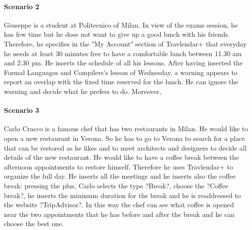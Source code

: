 \documentclass[12pt,titlepage]{article}
\begin{document}
\paragraph{Scenario 2}
Giuseppe is a student at Politecnico of Milan. In view of the exams session, he has few time but he does not want to give up a good lunch with his friends. Therefore, he specifies in the "My Account" section of Travlendar+ that everyday he needs at least 30 minutes free to have a comfortable lunch between 11.30 am and 2.30 pm. He inserts the schedule of all his lessons. After having inserted the Formal Languages and Compilers's lesson of Wednesday, a warning appears to report an overlap with the fixed time reserved for the lunch. He can ignore the warning and decide what he prefers to do. Moreover, 

\paragraph{Scenario 3}
Carlo Cracco is a famous chef that has two restaurants in Milan. He would like to open a new restaurant in Verona. So he has to go to Verona to search for a place that can be restored as he likes and to meet architects and designers to decide all details of the new restaurant. He would like to have a coffee break between the afternoon appointments to restore himself. Therefore he uses Travlendar+ to organize the full day. He inserts all the meetings and he inserts also the coffee break: pressing the plus, Carlo selects the type ?Break?, choose the ?Coffee break?, he inserts the minimum duration for the break and he is readdressed to the website ?TripAdvisor?. In this way the chef can see what coffee is opened near the two appointments that he has before and after the break and he can choose the best one.
\end{document}
